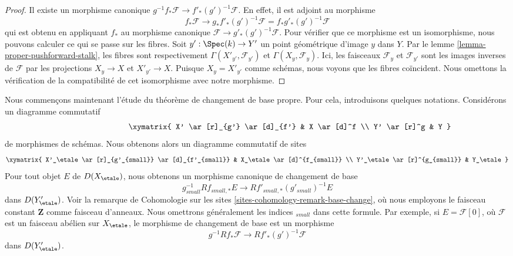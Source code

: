 \begin{proof}
Il existe un morphisme canonique $g^{-1}f_*\mathcal{F} \to f'_*(g')^{-1}\mathcal{F}$.
En effet, il est adjoint au morphisme
$$
f_*\mathcal{F} \longrightarrow
g_*f'_*(g')^{-1}\mathcal{F} = f_*g'_*(g')^{-1}\mathcal{F}
$$
qui est obtenu en appliquant $f_*$ au morphisme canonique
$\mathcal{F} \to g'_*(g')^{-1}\mathcal{F}$. Pour vérifier que ce morphisme est un
isomorphisme, nous pouvons calculer ce qui se passe sur les fibres.
Soit $y' : \Spec(k) \to Y'$ un point géométrique d'image $y$ dans $Y$.
Par le lemme \ref{lemma-proper-pushforward-stalk}, les fibres sont respectivement
$\Gamma(X'_{y'}, \mathcal{F}_{y'})$ et $\Gamma(X_y, \mathcal{F}_y)$.
Ici, les faisceaux $\mathcal{F}_y$ et $\mathcal{F}_{y'}$
sont les images inverses de $\mathcal{F}$ par les projections $X_y \to X$
et $X'_{y'} \to X$. Puisque $X_y = X'_{y'}$ comme schémas,
nous voyons que les fibres coïncident. Nous omettons la
vérification de la compatibilité de cet isomorphisme avec notre morphisme.
\end{proof}

\noindent
Nous commençons maintenant l'étude du théorème de changement de base propre.
Pour cela, introduisons quelques notations. Considérons un diagramme commutatif
\begin{equation}
\label{equation-base-change-diagram}
\vcenter{
\xymatrix{
X' \ar[r]_{g'} \ar[d]_{f'} & X \ar[d]^f \\
Y' \ar[r]^g & Y
}
}
\end{equation}
de morphismes de schémas. Nous obtenons alors un diagramme commutatif de sites
$$
\xymatrix{
X'_\etale \ar[r]_{g'_{small}} \ar[d]_{f'_{small}} &
X_\etale \ar[d]^{f_{small}} \\
Y'_\etale \ar[r]^{g_{small}} &
Y_\etale
}
$$
Pour tout objet $E$ de $D(X_\etale)$, nous obtenons un morphisme canonique de changement de base
\begin{equation}
\label{equation-base-change}
g_{small}^{-1}Rf_{small, *}E \longrightarrow Rf'_{small, *}(g'_{small})^{-1}E
\end{equation}
dans $D(Y'_\etale)$. Voir la remarque de Cohomologie sur les sites
\ref{sites-cohomology-remark-base-change}, où nous employons le faisceau
constant $\mathbf{Z}$ comme faisceau d'anneaux.
Nous omettrons généralement les indices ${}_{small}$ dans cette formule.
Par exemple, si $E = \mathcal{F}[0]$, où $\mathcal{F}$ est un faisceau
abélien sur $X_\etale$, le morphisme de changement de base est un morphisme
\begin{equation}
\label{equation-base-change-sheaf}
g^{-1}Rf_*\mathcal{F} \longrightarrow Rf'_*(g')^{-1}\mathcal{F}
\end{equation}
dans $D(Y'_\etale)$.

